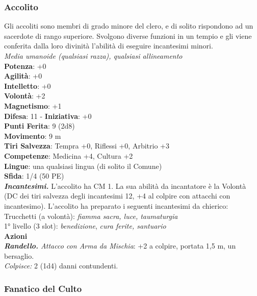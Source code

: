\begin{multicols}{2}
\subsubsection{Accolito}

Gli accoliti sono membri di grado minore del clero, e di solito rispondono ad un sacerdote di rango superiore. Svolgono diverse funzioni in un tempio e gli viene conferita dalla loro divinità l'abilità di eseguire incantesimi minori.\\
\emph{Media umanoide (qualsiasi razza), qualsiasi allineamento}\\
\textbf{Potenza}: +0\\
\textbf{Agilità}: +0\\
\textbf{Intelletto}: +0\\
\textbf{Volontà}: +2\\
\textbf{Magnetismo}: +1\\
\textbf{Difesa}: 11 - \textbf{Iniziativa}: +0\\
\textbf{Punti Ferita}: 9 (2d8)\\
\textbf{Movimento}: 9 m\\
\textbf{Tiri Salvezza}: Tempra +0, Riflessi +0, Arbitrio +3 \\
\textbf{Competenze}: Medicina +4, Cultura +2\\
\textbf{Lingue}: una qualsiasi lingua (di solito il Comune)\\
\textbf{Sfida}: 1/4 (50 PE)\smallskip\\
\emph{\textbf{Incantesimi.}} L'accolito ha CM 1. La sua abilità da incantatore è la Volontà (DC dei tiri salvezza degli incantesimi 12, +4 al colpire con attacchi con incantesimo). L'accolito ha preparato i seguenti incantesimi da chierico:\\
Trucchetti (a volontà): \emph{fiamma sacra, luce, taumaturgia} \\
1° livello (3 slot): \emph{benedizione}, \emph{cura ferite, santuario}\\
\smallskip\textbf{Azioni}\\
\emph{\textbf{Randello.} Attacco con Arma da Mischia}: +2 a colpire, portata 1,5 m, un bersaglio.\\
\emph{Colpisce:} 2 (1d4) danni contundenti.\\

\subsubsection{Fanatico del Culto}


\end{multicols}
